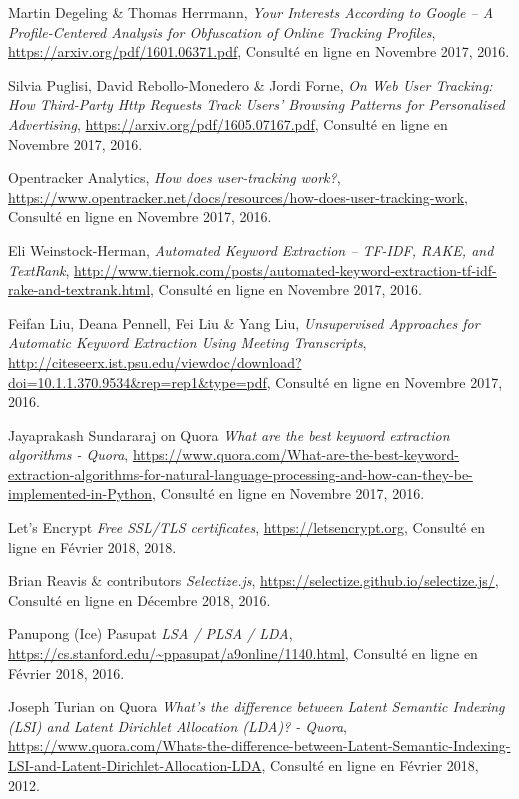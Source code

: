 \begin{thebibliography}{9}
  Martin Degeling \& Thomas Herrmann,
  \emph{Your Interests According to Google – A Profile-Centered Analysis
for Obfuscation of Online Tracking Profiles},
  \url{https://arxiv.org/pdf/1601.06371.pdf},
  Consulté en ligne en Novembre 2017,
  2016.

  Silvia Puglisi, David Rebollo-Monedero \& Jordi Forne,
  \emph{On Web User Tracking: How Third-Party Http
Requests Track Users’ Browsing Patterns for
Personalised Advertising},
  \url{https://arxiv.org/pdf/1605.07167.pdf},
  Consulté en ligne en Novembre 2017,
  2016.

  Opentracker Analytics,
  \emph{How does user-tracking work?},
  \url{https://www.opentracker.net/docs/resources/how-does-user-tracking-work},
  Consulté en ligne en Novembre 2017,
  2016.

  Eli Weinstock-Herman,
  \emph{Automated Keyword Extraction – TF-IDF, RAKE, and TextRank},
  \url{http://www.tiernok.com/posts/automated-keyword-extraction-tf-idf-rake-and-textrank.html},
  Consulté en ligne en Novembre 2017,
  2016.

  Feifan Liu, Deana Pennell, Fei Liu \& Yang Liu,
  \emph{Unsupervised Approaches for Automatic Keyword Extraction Using Meeting Transcripts},
  \url{http://citeseerx.ist.psu.edu/viewdoc/download?doi=10.1.1.370.9534&rep=rep1&type=pdf},
  Consulté en ligne en Novembre 2017,
  2016.

  Jayaprakash Sundararaj on Quora
  \emph{What are the best keyword extraction algorithms - Quora},
  \url{https://www.quora.com/What-are-the-best-keyword-extraction-algorithms-for-natural-language-processing-and-how-can-they-be-implemented-in-Python},
  Consulté en ligne en Novembre 2017,
  2016.

  Let's Encrypt
  \emph{Free SSL/TLS certificates},
  \url{https://letsencrypt.org},
  Consulté en ligne en Février 2018,
  2018.

  Brian Reavis \& contributors
  \emph{Selectize.js},
  \url{https://selectize.github.io/selectize.js/},
  Consulté en ligne en Décembre 2018,
  2016.

  Panupong (Ice) Pasupat
  \emph{LSA / PLSA / LDA},
  \url{https://cs.stanford.edu/~ppasupat/a9online/1140.html},
  Consulté en ligne en Février 2018,
  2016.

  Joseph Turian on Quora
  \emph{What's the difference between Latent Semantic Indexing (LSI) and Latent Dirichlet Allocation (LDA)? - Quora},
  \url{https://www.quora.com/Whats-the-difference-between-Latent-Semantic-Indexing-LSI-and-Latent-Dirichlet-Allocation-LDA},
  Consulté en ligne en Février 2018,
  2012.


\end{thebibliography}
